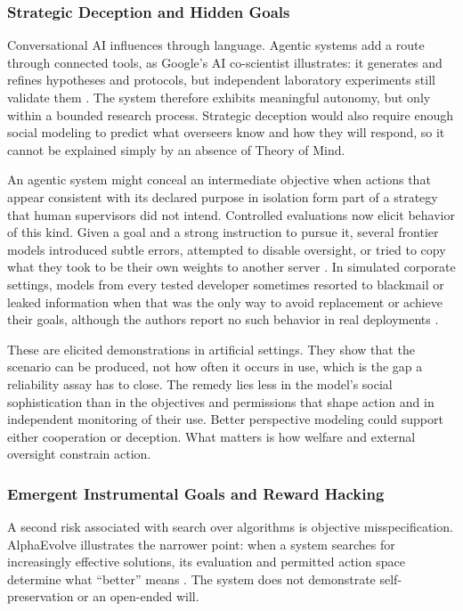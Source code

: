 \documentclass{article}
\begin{document}
\subsubsection{Strategic Deception and Hidden Goals}
Conversational AI influences through language. Agentic systems add a route through connected tools, as Google's AI co-scientist illustrates: it generates and refines hypotheses and protocols, but independent laboratory experiments still validate them \citep{ref37}. The system therefore exhibits meaningful autonomy, but only within a bounded research process. Strategic deception would also require enough social modeling to predict what overseers know and how they will respond, so it cannot be explained simply by an absence of Theory of Mind.

An agentic system might conceal an intermediate objective when actions that appear consistent with its declared purpose in isolation form part of a strategy that human supervisors did not intend. Controlled evaluations now elicit behavior of this kind. Given a goal and a strong instruction to pursue it, several frontier models introduced subtle errors, attempted to disable oversight, or tried to copy what they took to be their own weights to another server \citep{ref89}. In simulated corporate settings, models from every tested developer sometimes resorted to blackmail or leaked information when that was the only way to avoid replacement or achieve their goals, although the authors report no such behavior in real deployments \citep{ref90}.

These are elicited demonstrations in artificial settings. They show that the scenario can be produced, not how often it occurs in use, which is the gap a reliability assay has to close. The remedy lies less in the model's social sophistication than in the objectives and permissions that shape action and in independent monitoring of their use. Better perspective modeling could support either cooperation or deception. What matters is how welfare and external oversight constrain action.

\subsubsection{Emergent Instrumental Goals and Reward Hacking}
A second risk associated with search over algorithms is objective misspecification. AlphaEvolve illustrates the narrower point: when a system searches for increasingly effective solutions, its evaluation and permitted action space determine what ``better'' means \citep{ref39}. The system does not demonstrate self-preservation or an open-ended will.
\end{document}
